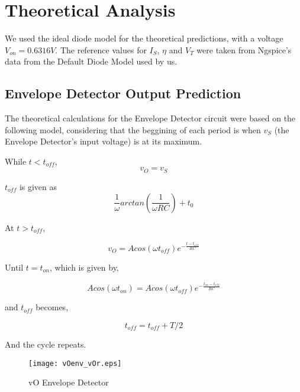 \section{Theoretical Analysis}
\label{sec:analysis}

We used the ideal diode model for the theoretical predictions, with a voltage $V_{on}=0.6316V$. The reference values for $I_S$, $\eta$ and $V_T$ were taken from Ngspice's data from the Default Diode Model used by us.

\subsection{Envelope Detector Output Prediction}
\label{ed}

The theoretical calculations for the Envelope Detector circuit were based on the following model, considering that the beggining of each period is when $v_S$ (the Envelope Detector's input voltage) is at its maximum. \par

While $t<t_{off}$,
\begin{equation}
v_O=v_S
\label{eq:kvl3}
\end{equation}

 $t_{off}$ is given as 
\begin{equation}
\frac{1}{\omega}arctan(\frac{1}{\omega RC})+t_0 
\label{eq:kvl4}
\end{equation}

At $t>t_{off}$, 

\begin{equation}
v_O=Acos(\omega t_{off})e^{-\frac{t-t_{off}}{RC}}
\label{eq:kvl5}
\end{equation}

Until $t=t_{on}$, which is given by,

\begin{equation}
Acos(\omega t_{on})=Acos(\omega t_{off})e^{-\frac{t_{on}-t_{off}}{RC}}
\label{eq:kvl6}
\end{equation}

and $t_{off}$ becomes,

\begin{equation}
t_{off}=t_{off}+T/2
\label{eq:kvl10}
\end{equation}

And the cycle repeats.

\begin{figure}[h] \centering
\texttt{[image: vOenv\_vOr.eps]}
\caption{vO Envelope Detector}
\label{fig:vOenv}
\end{figure}

